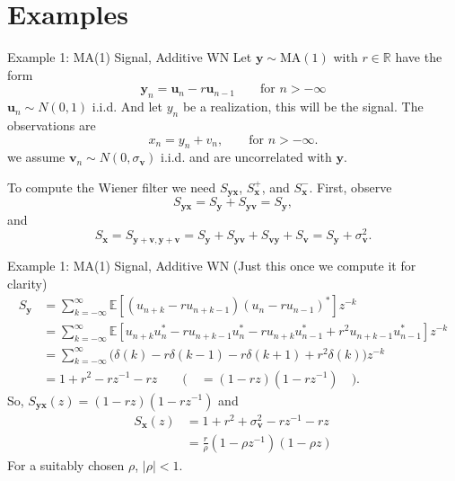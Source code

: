 \documentclass{beamer}  %
\newcommand{\R}{\mathbb{R}}
\newcommand{\E}{\mathbb{E}}
\begin{document}
\section{Examples}
\begin{frame}{Example 1: MA(1) Signal, Additive WN}
	Let $\textbf{y} \sim \text{MA}(1)$ with $r \in \R$ have the form 
	$$\textbf{y}_n = \textbf{u}_n - r\textbf{u}_{n-1} \qquad \text{for } n > -\infty$$
	$\textbf{u}_n \sim N(0,1)$ i.i.d. And let $y_n$ be a realization, this will be the signal. The observations are
	$$x_n = y_n + v_n, \qquad \text{for } n > -\infty.$$
	we assume $\textbf{v}_n \sim N(0,\sigma_{\textbf{v}})$ i.i.d.  and are uncorrelated with $\textbf{y}$. 
	
	\bigskip
	
	To compute the Wiener filter we need $S_{\textbf{yx}}$, $S^+_{\textbf{x}}$, and $S^-_{\textbf{x}}$.
	First, observe
	$$S_{\textbf{yx}} = S_{\textbf{y}} + S_{\textbf{yv}} = S_{\textbf{y}},$$
	and 
	$$S_{\textbf{x}} = S_{\textbf{y}+\textbf{v},\textbf{y}+\textbf{v}} = S_{\textbf{y}} + S_{\textbf{yv}} + S_{\textbf{vy}} + S_{\textbf{v}} = S_{\textbf{y}} + \sigma_{\textbf{v}}^2.$$ 
\end{frame}	


\begin{frame}{Example 1: MA(1) Signal, Additive WN}
	(Just this once we compute it for clarity)
	\begin{align*}
	S_{\textbf{y}} &= \sum_{k = -\infty}^\infty \E[(u_{n+k} - ru_{n+k-1})(u_n - ru_{n-1})^*]z^{-k} \\
	&= \sum_{k = -\infty}^\infty \E[u_{n+k}u^*_n - ru_{n+k-1}u^*_n - ru_{n+k}u^*_{n-1} + r^2u_{n+k-1}u^*_{n-1}]z^{-k} \\
	&= \sum_{k = -\infty}^\infty \big(\delta(k) - r\delta(k-1) - r\delta(k+1) +r^2\delta(k)\big)z^{-k} \\
	&= 1 + r^2 - rz^{-1} - rz \qquad \big(\quad = (1-rz)(1-rz^{-1})\quad\big).
	\end{align*}
	So, $S_{\textbf{yx}}(z) = (1-rz)(1-rz^{-1})$ and
	\begin{align*}
	S_{\textbf{x}}(z) &= 1 + r^2 + \sigma_{\textbf{v}}^2 - rz^{-1} - rz\\
	& = \frac{r}{\rho}(1 - \rho z^{-1})(1 - \rho z)
	\end{align*}
	For a suitably chosen $\rho$, $|\rho| < 1$.
\end{frame}	
\end{document}
